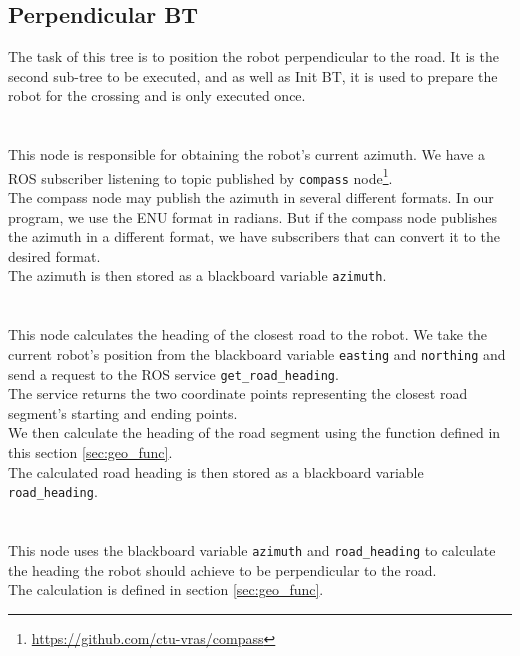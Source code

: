 \subsection{Perpendicular BT}
\label{sec:Perpendicular-BT-impl}
    The task of this tree is to position the robot perpendicular to the road. It is the second sub-tree to be executed, and as well as Init BT, it is used to prepare the robot for the crossing and is only executed once.\\\\
    \\
        This node is responsible for obtaining the robot's current azimuth. We have a ROS subscriber listening to topic published by \texttt{compass} node\footnote{\url{https://github.com/ctu-vras/compass}}.\\
        The compass node may publish the azimuth in several different formats. In our program, we use the ENU format in radians. But if the compass node publishes the azimuth in a different format, we have subscribers that can convert it to the desired format.\\
        The azimuth is then stored as a blackboard variable \texttt{azimuth}.\\\\
    \\
        This node calculates the heading of the closest road to the robot. We take the current robot's position from the blackboard variable \texttt{easting} and \texttt{northing} and send a request to the ROS service \texttt{get\_road\_heading}.\\
        The service returns the two coordinate points representing the closest road segment's starting and ending points.\\
        We then calculate the heading of the road segment using the function defined in this section \ref{sec:geo_func}.\\
        The calculated road heading is then stored as a blackboard variable \texttt{road\_heading}.\\\\
    \\
        This node uses the blackboard variable \texttt{azimuth} and \texttt{road\_heading} to calculate the heading the robot should achieve to be perpendicular to the road.\\
        The calculation is defined in section \ref{sec:geo_func}.\\

